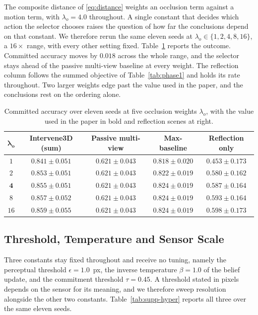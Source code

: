 \documentclass{article} %
\theoremstyle{defstyle}
\theoremstyle{plain}
\begin{document}
The composite distance of \eqref{eq:distance} weights an occlusion term against a motion term,
with $\lambda_o = 4.0$ throughout. A single constant that decides which action the selector
chooses raises the question of how far the conclusions depend on that constant. We therefore
rerun the same eleven seeds at $\lambda_o \in \{1, 2, 4, 8, 16\}$, a $16\times$ range, with
every other setting fixed. Table~\ref{tab:supp-occlusion} reports the outcome. Committed
accuracy moves by $0.018$ across the whole range, and the selector stays ahead of the passive
multi-view baseline at every weight. The reflection column follows the summed objective
of Table~\ref{tab:phase1} and holds its rate throughout. Two larger weights edge past the value used in the paper, and the conclusions rest on the ordering alone.

\begin{table}[htb]
\caption{Committed accuracy over eleven seeds at five occlusion weights $\lambda_o$, with the value used in the paper in bold and reflection scenes at right.}
\label{tab:supp-occlusion}
\begin{center}
\footnotesize
\begin{tabular}{ccccc}
\toprule
$\boldsymbol{\lambda_o}$ & \textbf{Intervene3D (sum)} & \textbf{Passive multi-view} &
\textbf{Max-baseline} & \textbf{Reflection only} \\
\midrule
$1$  & $0.841 \pm 0.051$ & $0.621 \pm 0.043$ & $0.818 \pm 0.020$ & $0.453 \pm 0.173$ \\
$2$  & $0.853 \pm 0.051$ & $0.621 \pm 0.043$ & $0.822 \pm 0.019$ & $0.580 \pm 0.162$ \\
$\mathbf{4}$ & $\mathbf{0.855 \pm 0.051}$ & $0.621 \pm 0.043$ & $0.824 \pm 0.019$ & $0.587 \pm 0.164$ \\
$8$  & $0.857 \pm 0.052$ & $0.621 \pm 0.043$ & $0.824 \pm 0.019$ & $0.593 \pm 0.164$ \\
$16$ & $0.859 \pm 0.055$ & $0.621 \pm 0.043$ & $0.824 \pm 0.019$ & $0.598 \pm 0.173$ \\
\bottomrule
\end{tabular}
\end{center}
\end{table}

\subsection{Threshold, Temperature and Sensor Scale}
\label{sec:supp-hyper}

Three constants stay fixed throughout and receive no tuning, namely the perceptual
threshold $\epsilon = 1.0$~px, the inverse temperature $\beta = 1.0$ of the belief update,
and the commitment threshold $\tau = 0.45$. A threshold stated in pixels depends on the
sensor for its meaning, and we therefore sweep resolution alongside the other two constants.
Table~\ref{tab:supp-hyper} reports all three over the same eleven seeds.
\end{document}

